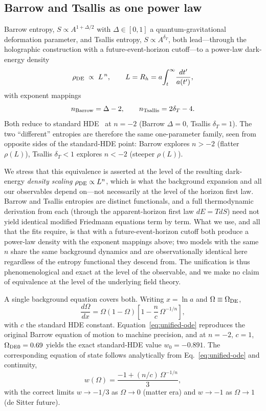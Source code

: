 \documentclass[twocolumn,10pt]{article}
\begin{document}
\subsection{Barrow and Tsallis as one power law}

Barrow entropy, $S\propto A^{1+\Delta/2}$ with $\Delta\in[0,1]$ a
quantum-gravitational deformation parameter, and Tsallis entropy,
$S\propto A^{\delta_T}$, both lead---through the holographic
construction with a future-event-horizon cutoff---to a power-law dark-energy
density
\begin{equation}
\rho_{\rm DE}\;\propto\; L^{\,n}, \qquad L = R_h = a\!\int_t^\infty\!\frac{dt'}{a(t')},
\label{eq:powerlaw}
\end{equation}
with exponent mappings
\begin{equation}
n_{\rm Barrow}=\Delta-2, \qquad n_{\rm Tsallis}=2\delta_T-4 .
\label{eq:mappings}
\end{equation}
Both reduce to standard HDE~\cite{Li2004} at $n=-2$ (Barrow $\Delta=0$,
Tsallis $\delta_T=1$). The two ``different'' entropies are therefore the same
one-parameter family, seen from opposite sides of the standard-HDE point:
Barrow explores $n>-2$ (flatter $\rho(L)$), Tsallis $\delta_T<1$ explores
$n<-2$ (steeper $\rho(L)$).

We stress that this equivalence is asserted at the level of the resulting
dark-energy \emph{density scaling} $\rho_{\rm DE}\propto L^n$, which is what the
background expansion and all our observables depend on---not necessarily at the
level of the horizon first law. Barrow and Tsallis entropies are distinct
functionals, and a full thermodynamic derivation from each (through the
apparent-horizon first law $dE=TdS$) need not yield identical modified
Friedmann equations term by term. What we use, and all that the fits require,
is that with a future-event-horizon cutoff both produce a power-law density
with the exponent mappings above; two models with the same $n$ share the same
background dynamics and are observationally identical here regardless of the
entropy functional they descend from. The unification is thus phenomenological
and exact at the level of the observable, and we make no claim of equivalence
at the level of the underlying field theory.

A single background equation covers both. Writing $x=\ln a$ and
$\Omega\equiv\Omega_{\rm DE}$,
\begin{equation}
\frac{d\Omega}{dx}=\Omega(1-\Omega)\left[1-\frac{n}{c}\,\Omega^{-1/n}\right],
\label{eq:unified-ode}
\end{equation}
with $c$ the standard HDE constant. Equation~\eqref{eq:unified-ode} reproduces
the original Barrow equation of motion to machine precision, and at $n=-2$,
$c=1$, $\Omega_{\rm DE0}=0.69$ yields the exact standard-HDE value
$w_0=-0.891$. The corresponding equation of state follows analytically from
Eq.~\eqref{eq:unified-ode} and continuity,
\begin{equation}
w(\Omega)=\frac{-1+(n/c)\,\Omega^{-1/n}}{3},
\label{eq:eos}
\end{equation}
with the correct limits $w\to-1/3$ as $\Omega\to0$ (matter era) and $w\to-1$
as $\Omega\to1$ (de Sitter future).
\end{document}

